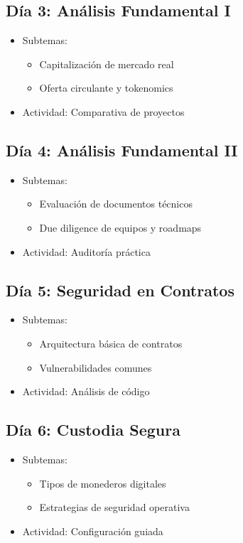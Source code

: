 \documentclass{article}
\begin{document}
\subsection*{Día 3: Análisis Fundamental I}
\begin{itemize}
    \item Subtemas:
    \begin{itemize}
        \item Capitalización de mercado real
        \item Oferta circulante y tokenomics
    \end{itemize}
    \item Actividad: Comparativa de proyectos
\end{itemize}

\subsection*{Día 4: Análisis Fundamental II}
\begin{itemize}
    \item Subtemas:
    \begin{itemize}
        \item Evaluación de documentos técnicos
        \item Due diligence de equipos y roadmaps
    \end{itemize}
    \item Actividad: Auditoría práctica
\end{itemize}

\subsection*{Día 5: Seguridad en Contratos}
\begin{itemize}
    \item Subtemas:
    \begin{itemize}
        \item Arquitectura básica de contratos
        \item Vulnerabilidades comunes
    \end{itemize}
    \item Actividad: Análisis de código
\end{itemize}

\subsection*{Día 6: Custodia Segura}
\begin{itemize}
    \item Subtemas:
    \begin{itemize}
        \item Tipos de monederos digitales
        \item Estrategias de seguridad operativa
    \end{itemize}
    \item Actividad: Configuración guiada
\end{itemize}
\end{document}
